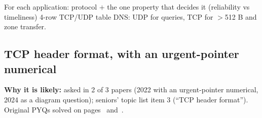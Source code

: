 \begin{answerplan}[2.5 marks]
 For each application: protocol $+$ the one property that decides it (reliability vs timeliness) \quad {} 4-row TCP/UDP table \quad {} DNS: UDP for queries, TCP for $>$512 B and zone transfer.
\end{answerplan}

\subsection{TCP header format, with an urgent-pointer numerical}\label{iq:C30}
    

\textbf{Why it is likely:} asked in 2 of 3 papers (2022 with an urgent-pointer numerical, 2024 as a diagram question); seniors' topic list item 3 (``TCP header format''). Original PYQs solved on pages~\pageref{q:MS2024-3b} and~\pageref{q:MS2022-2a}.

